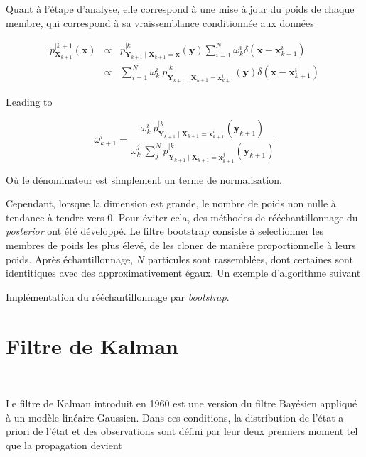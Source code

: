Quant à l'étape d'analyse, elle correspond à une mise à jour du poids de chaque membre, qui correspond à sa vraissemblance conditionnée aux données

\begin{eqnarray*}
    p_{\bm X_{k+1}}^{\mid k+1}(\bm x) &\propto& p_{\bm Y_{k+1} \mid \bm X_{k+1} = \bm x}^{\mid k}(\bm y)  \sum_{i=1}^N \omega^i_k \delta(\bm x - \bm x_{k+1}^i) \\
    &\propto& \sum_{i=1}^N  \omega^i_k~p_{\bm Y_{k+1} \mid \bm X_{k+1} = \bm x_{k+1}^i}^{\mid k}(\bm y)\delta(\bm x - \bm x_{k+1}^i)
\end{eqnarray*}

Leading to

\begin{equation*}
    \omega^i_{k+1}  = \frac{\omega^i_k~p_{\bm Y_{k+1} \mid \bm X_{k+1} = \bm x_{k+1}^i}^{\mid k}(\bm y_{k+1}) }{\omega^j_k~\sum_j^N p_{\bm Y_{k+1} \mid \bm X_{k+1} = \bm x_{k+1}^j}^{\mid k}(\bm y_{k+1}) }
\end{equation*}

Où le dénominateur est simplement un terme de normalisation.

Cependant, lorsque la dimension est grande, le nombre de poids non nulle à tendance à tendre vers 0. Pour éviter cela, des méthodes de rééchantillonnage du \textit{posterior} ont été développé. Le filtre bootstrap \cite{gordon_1993} consiste à selectionner les membres de poids les plus élevé, de les cloner de manière proportionnelle à leurs poids. Après échantillonnage, $N$ particules sont rassemblées, dont certaines sont identitiques avec des approximativement égaux.
Un exemple d'algorithme suivant

\begin{algorithm}
    \caption{Implémentation du rééchantillonnage par \textit{bootstrap}.}
    \For{membre $n$ do}{
    Tirer $u$ dans $\mathcal{U}[0,1[$\;
    Initialiser $j=1$\;
    Affecter $S_w = w^1$\;
    \While{$S_w < u$}{
        $j = j+1$\;
        $S_w = S_w + w(j)\;$
    }
    Le membre $j$  est conservé et remplace le membre $n$.
    }
\end{algorithm}


\section{Filtre de Kalman}~\label{kalman_filter}

Le filtre de Kalman introduit en 1960 \cite{kalman_new_1960} est une version du filtre Bayésien appliqué à un modèle linéaire Gaussien. Dans ces conditions, la distribution de l'état a priori de l'état et des observations sont défini par leur deux premiers moment tel que la propagation devient

